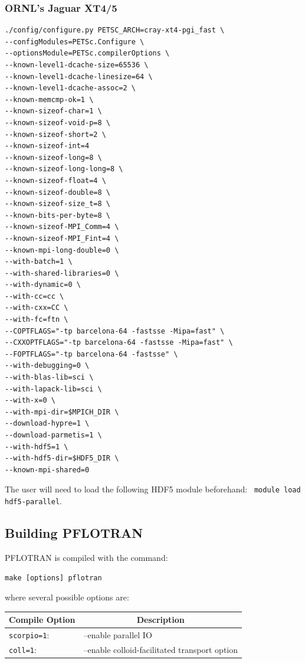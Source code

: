 {

\subsubsection{ORNL's Jaguar XT4/5}

\footnotesize
\begin{verbatim}
./config/configure.py PETSC_ARCH=cray-xt4-pgi_fast \
--configModules=PETSc.Configure \
--optionsModule=PETSc.compilerOptions \
--known-level1-dcache-size=65536 \
--known-level1-dcache-linesize=64 \
--known-level1-dcache-assoc=2 \
--known-memcmp-ok=1 \
--known-sizeof-char=1 \
--known-sizeof-void-p=8 \
--known-sizeof-short=2 \
--known-sizeof-int=4
--known-sizeof-long=8 \
--known-sizeof-long-long=8 \
--known-sizeof-float=4 \
--known-sizeof-double=8 \
--known-sizeof-size_t=8 \
--known-bits-per-byte=8 \
--known-sizeof-MPI_Comm=4 \
--known-sizeof-MPI_Fint=4 \
--known-mpi-long-double=0 \
--with-batch=1 \
--with-shared-libraries=0 \
--with-dynamic=0 \
--with-cc=cc \
--with-cxx=CC \
--with-fc=ftn \
--COPTFLAGS="-tp barcelona-64 -fastsse -Mipa=fast" \
--CXXOPTFLAGS="-tp barcelona-64 -fastsse -Mipa=fast" \
--FOPTFLAGS="-tp barcelona-64 -fastsse" \
--with-debugging=0 \
--with-blas-lib=sci \
--with-lapack-lib=sci \
--with-x=0 \
--with-mpi-dir=$MPICH_DIR \
--download-hypre=1 \
--download-parmetis=1 \
--with-hdf5=1 \
--with-hdf5-dir=$HDF5_DIR \
--known-mpi-shared=0
\end{verbatim}
\normalsize
The user will need to load the following HDF5 module beforehand: \ \verb|module load hdf5-parallel|.

\subsection{Building PFLOTRAN}
 
PFLOTRAN is compiled with the command:

\verb|make [options] pflotran|

\noindent
where several possible options are: 

\begin{tabular}{ll}
Compile Option & \multicolumn{1}{c}{Description}\\
\midrule
\verb|scorpio=1|: & --enable parallel IO\\
\verb|coll=1|: & --enable colloid-facilitated transport option\\
\end{tabular}

}
